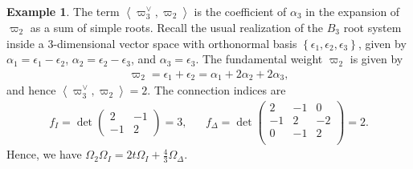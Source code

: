 \documentclass[10pt]{article}
\numberwithin{thm}{section}
\theoremstyle{definition}
\newtheorem{example}[thm]{Example}
\theoremstyle{remark}
\begin{document}
\begin{example}
The term $\left\langle\varpi_3^\vee,\varpi_2\right\rangle$ is the coefficient of $\alpha_3$ in the expansion of $\varpi_2$ as a sum of simple roots.
Recall the usual realization of the $B_3$ root system inside a $3$-dimensional vector space with orthonormal basis $\left\{\epsilon_1,\epsilon_2,\epsilon_3\right\}$,
given by $\alpha_1=\epsilon_1-\epsilon_2$, $\alpha_2=\epsilon_2-\epsilon_3$, and $\alpha_3=\epsilon_3$.
The fundamental weight $\varpi_2$ is given by
\begin{align*}
\varpi_2=\epsilon_1+\epsilon_2=\alpha_1+2\alpha_2+2\alpha_3,
\end{align*}
and hence $\left\langle\varpi_3^\vee,\varpi_2\right\rangle=2$.
The connection indices are
\begin{align*}
f_I=\det\begin{pmatrix}2&-1\\-1&2\end{pmatrix}=3,&&
f_\Delta=\det\begin{pmatrix}2&-1&0\\-1&2&-2\\0&-1&2\\\end{pmatrix}=2.
\end{align*}
Hence, we have $\Omega_2\Omega_I=2t\Omega_I+\frac43\Omega_\Delta$.
\end{example}
\end{document}
